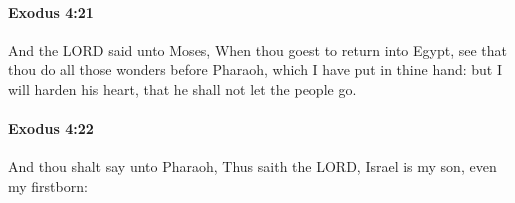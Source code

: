 		\paragraph{Exodus 4:21} %
			\label{EXODUS-4-21}

			And the LORD said unto Moses, When thou goest to return into Egypt, see that thou do all those wonders before Pharaoh, which I have put in thine hand: but I will harden his heart, that he shall not let the people go.


		\paragraph{Exodus 4:22} %
			\label{EXODUS-4-22}

			And thou shalt say unto Pharaoh, Thus saith the LORD, Israel is my son, even my firstborn:

